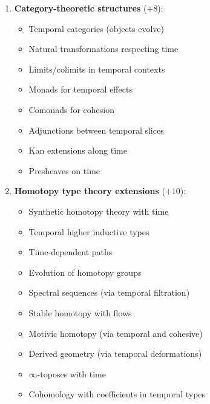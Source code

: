 \documentclass[11pt]{article}
\theoremstyle{definition}
\begin{document}
\begin{enumerate}[leftmargin=*]
\item \textbf{Category-theoretic structures} ($+8$):
\begin{itemize}
\item Temporal categories (objects evolve)
\item Natural transformations respecting time
\item Limits/colimits in temporal contexts
\item Monads for temporal effects
\item Comonads for cohesion
\item Adjunctions between temporal slices
\item Kan extensions along time
\item Presheaves on time
\end{itemize}

\item \textbf{Homotopy type theory extensions} ($+10$):
\begin{itemize}
\item Synthetic homotopy theory with time
\item Temporal higher inductive types
\item Time-dependent paths
\item Evolution of homotopy groups
\item Spectral sequences (via temporal filtration)
\item Stable homotopy with flows
\item Motivic homotopy (via temporal and cohesive)
\item Derived geometry (via temporal deformations)
\item $\infty$-toposes with time
\item Cohomology with coefficients in temporal types
\end{itemize}


\end{enumerate}
\end{document}
